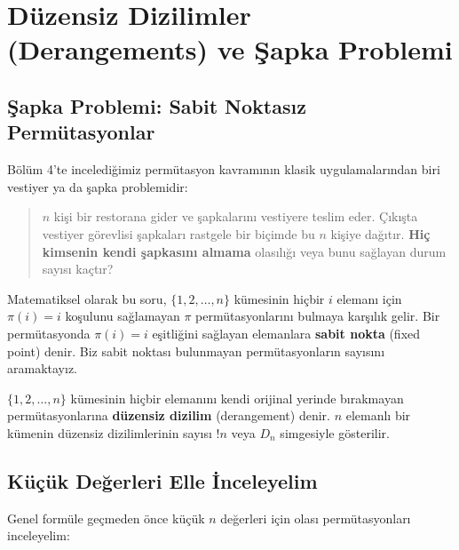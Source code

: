 \section{Düzensiz Dizilimler (Derangements) ve Şapka Problemi}

\subsection{Şapka Problemi: Sabit Noktasız Permütasyonlar}

Bölüm 4'te incelediğimiz permütasyon kavramının klasik uygulamalarından biri
vestiyer ya da şapka problemidir: \begin{quote} $n$ kişi bir restorana gider ve
şapkalarını vestiyere teslim eder. Çıkışta vestiyer görevlisi şapkaları rastgele
bir biçimde bu $n$ kişiye dağıtır. \textbf{Hiç kimsenin kendi şapkasını almama}
olasılığı veya bunu sağlayan durum sayısı kaçtır? \end{quote}

Matematiksel olarak bu soru, $\{1, 2, \dots, n\}$ kümesinin hiçbir $i$ elemanı
için $\pi(i) = i$ koşulunu sağlamayan $\pi$ permütasyonlarını bulmaya karşılık
gelir. Bir permütasyonda $\pi(i) = i$ eşitliğini sağlayan elemanlara \textbf{sabit
nokta} (fixed point) denir. Biz sabit noktası bulunmayan permütasyonların
sayısını aramaktayız.

\begin{definition} $\{1, 2, \dots, n\}$ kümesinin
hiçbir elemanını kendi orijinal yerinde bırakmayan permütasyonlarına
\textbf{düzensiz dizilim} (derangement) denir. $n$ elemanlı bir kümenin düzensiz
dizilimlerinin sayısı $!n$ veya $D_n$ simgesiyle gösterilir. \end{definition}

\subsection{Küçük Değerleri Elle İnceleyelim}

Genel formüle geçmeden önce küçük $n$ değerleri için olası permütasyonları
inceleyelim:

